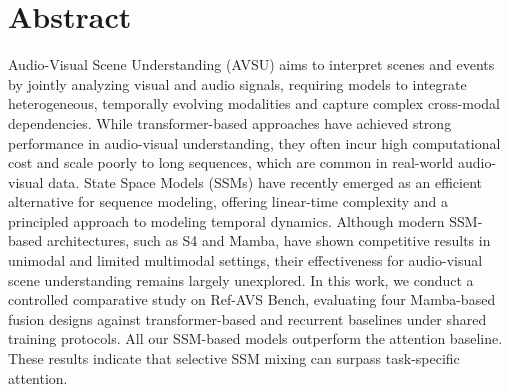 \documentclass[a4paper,12pt]{extarticle}
\begin{document}
\setcounter{page}{2}

{
	\hypersetup{linkcolor=black}
	\tableofcontents
}

\newpage

\newpage
\section*{Abstract}
Audio-Visual Scene Understanding (AVSU) aims to interpret scenes and events by jointly analyzing visual and audio signals, requiring models to integrate heterogeneous, temporally evolving modalities and capture complex cross-modal dependencies. While transformer-based approaches have achieved strong performance in audio-visual understanding, they often incur high computational cost and scale poorly to long sequences, which are common in real-world audio-visual data. State Space Models (SSMs) have recently emerged as an efficient alternative for sequence modeling, offering linear-time complexity and a principled approach to modeling temporal dynamics. Although modern SSM-based architectures, such as S4 and Mamba, have shown competitive results in unimodal and limited multimodal settings, their effectiveness for audio-visual scene understanding remains largely unexplored. In this work, we conduct a controlled comparative study on Ref-AVS Bench, evaluating four Mamba-based fusion designs against transformer-based and recurrent baselines under shared training protocols. All our SSM-based models outperform the attention baseline. These results indicate that selective SSM mixing can surpass task-specific attention.
\end{document}
